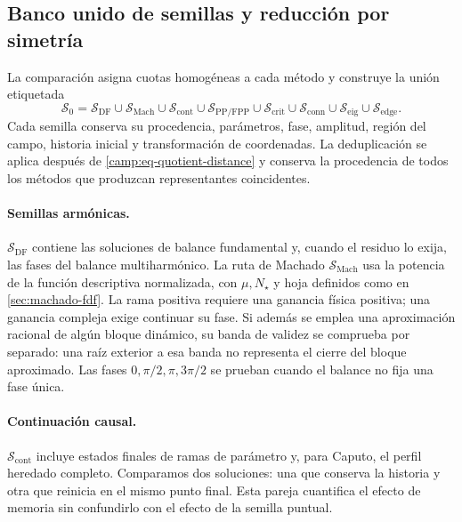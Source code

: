 \subsection{Banco unido de semillas y reducción por simetría}
\label{camp:banco-semillas}

La comparación asigna cuotas homogéneas a cada método y construye la unión
etiquetada
\begin{equation}
 \mathcal S_0=
 \mathcal S_{\mathrm{DF}}
 \cup\mathcal S_{\mathrm{Mach}}
 \cup\mathcal S_{\mathrm{cont}}
 \cup\mathcal S_{\mathrm{PP/FPP}}
 \cup\mathcal S_{\mathrm{crit}}
 \cup\mathcal S_{\mathrm{conn}}
 \cup\mathcal S_{\mathrm{eig}}
 \cup\mathcal S_{\mathrm{edge}}.
 \label{camp:eq-seed-union}
\end{equation}
Cada semilla conserva su procedencia, parámetros, fase, amplitud, región del
campo, historia inicial y transformación de coordenadas. La deduplicación se
aplica después de \cref{camp:eq-quotient-distance} y conserva la procedencia
de todos los métodos que produzcan representantes coincidentes.

\paragraph{Semillas armónicas.}
\(\mathcal S_{\mathrm{DF}}\) contiene las soluciones de balance fundamental y,
cuando el residuo lo exija, las fases del balance multiharmónico. La ruta de
Machado \(\mathcal S_{\mathrm{Mach}}\) usa la potencia de la función
descriptiva normalizada, con \(\mu,N_\star\) y hoja definidos como en
\cref{sec:machado-fdf}. La rama positiva requiere una ganancia física
positiva; una ganancia compleja exige continuar su fase. Si además se
emplea una aproximación racional de algún bloque dinámico, su banda de
validez se comprueba por separado: una raíz exterior a esa banda no
representa el cierre del bloque aproximado. Las fases \(0,\pi/2,\pi,3\pi/2\) se
prueban cuando el balance no fija una fase única.

\paragraph{Continuación causal.}
\(\mathcal S_{\mathrm{cont}}\) incluye estados finales de ramas de parámetro y,
para Caputo, el perfil heredado completo. Comparamos dos soluciones:
una que conserva la historia y otra que reinicia en el mismo punto final. Esta
pareja cuantifica el efecto de memoria sin confundirlo con el efecto de la
semilla puntual.

